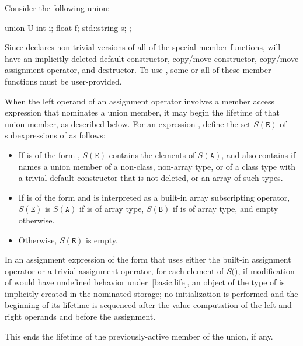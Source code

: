 \pnum
\begin{example} Consider the following union:

\begin{codeblock}
union U {
  int i;
  float f;
  std::string s;
};
\end{codeblock}

Since  declares non-trivial versions of all of the special
member functions,  will have an implicitly deleted default constructor,
copy/move constructor,
copy/move assignment operator, and destructor.
To use , some or all of these member functions
must be user-provided.\end{example}

\pnum
When the left operand of an assignment operator
involves a member access expression
that nominates a union member,
it may begin the lifetime of that union member,
as described below.
For an expression ,
define the set $S(\mathtt{E})$
of subexpressions of 
as follows:
\begin{itemize}
\item
If  is of the form ,
$S(\mathtt{E})$ contains the elements of $S(\mathtt{A})$,
and also contains 
if  names a union member of a non-class, non-array type,
or of a class type with a trivial default constructor that is not deleted,
or an array of such types.
\item
If  is of the form 
and is interpreted as a built-in array subscripting operator,
$S(\mathtt{E})$ is $S(\mathtt{A})$ if  is of array type,
$S(\mathtt{B})$ if  is of array type,
and empty otherwise.
\item
Otherwise, $S(\mathtt{E})$ is empty.
\end{itemize}
In an assignment expression of the form 
that uses either the built-in assignment operator
or a trivial assignment operator,
for each element  of $S($$)$,
if modification of  would have undefined behavior under~\ref{basic.life},
an object of the type of  is implicitly created
in the nominated storage;
no initialization is performed and
the beginning of its lifetime is sequenced after
the value computation of the left and right operands
and before the assignment.
\begin{note}
This ends the lifetime of the previously-active
member of the union, if any.
\end{note}
